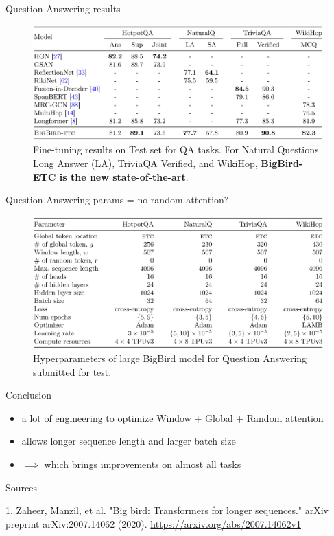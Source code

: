 \documentclass{beamer}
\begin{document}
\begin{frame}{Question Answering results}
\begin{figure}[h]
\includegraphics[width=\textwidth]{img/qa_res}
\caption{Fine-tuning results on Test set for QA tasks. For Natural Questions Long Answer (LA), TriviaQA Verified, and WikiHop, \textbf{BigBird-ETC is the new state-of-the-art}.}
\end{figure}
\end{frame}
\begin{frame}{Question Answering params = no random attention?}
\begin{figure}[h]
\includegraphics[width=\textwidth]{img/qa_params}
\caption{Hyperparameters of large BigBird model for Question Answering submitted for test.}
\end{figure}
\end{frame}
\begin{frame}{Conclusion}
\begin{itemize}
\item a lot of engineering to optimize Window + Global + Random attention
\item allows longer sequence length and larger batch size
\item $\implies$ which brings improvements on almost all tasks
\end{itemize}
\end{frame}

\begin{frame}{Sources}
\begin{thebibliography}{0}

   1. Zaheer, Manzil, et al. "Big bird: Transformers for longer sequences." arXiv preprint arXiv:2007.14062 (2020). \url{https://arxiv.org/abs/2007.14062v1} 

  
\end{thebibliography}
\end{frame} 
\end{document}
